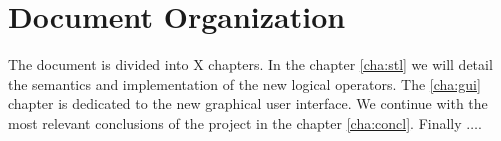 \section{Document Organization}

The document is divided into X chapters. In the chapter \ref{cha:stl} we will detail the semantics and implementation of the new logical operators. The \ref{cha:gui} chapter is dedicated to the new graphical user interface. We continue with the most relevant conclusions of the project in the chapter \ref{cha:concl}. Finally $\ldots$.